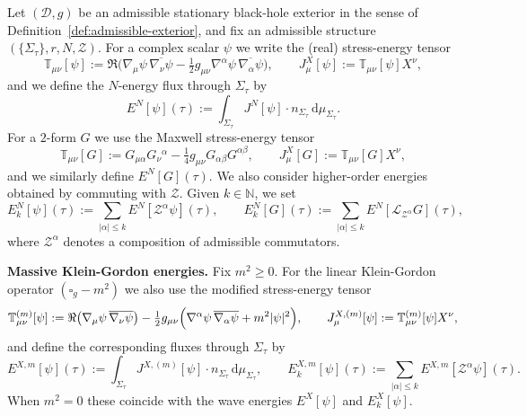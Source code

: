 \documentclass[11pt]{article}
\numberwithin{equation}{section}
\theoremstyle{plain}
\theoremstyle{definition}
\theoremstyle{remark}
\newcommand{\dd}{\mathrm{d}}
\begin{document}
Let $(\mathcal D,g)$ be an admissible stationary black-hole exterior in the sense of Definition~\ref{def:admissible-exterior},
and fix an admissible structure $(\{\Sigma_{\tau}\},r,N,\mathcal Z)$.
For a complex scalar $\psi$ we write the (real) stress-energy tensor
\begin{equation}
\mathbb T_{\mu\nu}[\psi]
:=\Re\bigl(\nabla_{\mu}\psi\,\overline{\nabla_{\nu}\psi}-\tfrac12 g_{\mu\nu}\nabla^{\alpha}\psi\,\overline{\nabla_{\alpha}\psi}\bigr),
\qquad
J^{X}_{\mu}[\psi]:=\mathbb T_{\mu\nu}[\psi]X^{\nu},
\end{equation}
and we define the $N$-energy flux through $\Sigma_{\tau}$ by
\begin{equation}
E^{N}[\psi](\tau):=\int_{\Sigma_{\tau}} J^{N}[\psi]\cdot n_{\Sigma_{\tau}}\,\dd\mu_{\Sigma_{\tau}}.
\end{equation}
For a $2$-form $G$ we use the Maxwell stress-energy tensor
\begin{equation}
\mathbb T_{\mu\nu}[G]:=G_{\mu\alpha}G_{\nu}{}^{\alpha}-\tfrac14 g_{\mu\nu}G_{\alpha\beta}G^{\alpha\beta},
\qquad
J^{X}_{\mu}[G]:=\mathbb T_{\mu\nu}[G]X^{\nu},
\end{equation}
and we similarly define $E^{N}[G](\tau)$.
We also consider higher-order energies obtained by commuting with $\mathcal Z$.
Given $k\in\mathbb N$, we set
\begin{equation}
E^{N}_{k}[\psi](\tau):=\sum_{|\alpha|\le k} E^{N}[\mathcal Z^{\alpha}\psi](\tau),
\qquad
E^{N}_{k}[G](\tau):=\sum_{|\alpha|\le k} E^{N}[\mathcal{L}_{\mathcal Z^{\alpha}}G](\tau),
\end{equation}
where $\mathcal Z^{\alpha}$ denotes a composition of admissible commutators.

\medskip
\noindent\textbf{Massive Klein-Gordon energies.}
Fix $m^{2}\ge 0$.
For the linear Klein-Gordon operator $(\square_{g}-m^{2})$ we also use the modified stress-energy tensor
\begin{equation}
\mathbb T^{(m)}_{\mu\nu}[\psi]
:=
\Re\!\left(\nabla_{\mu}\psi\,\overline{\nabla_{\nu}\psi}\right)
-\tfrac12 g_{\mu\nu}\Bigl(\nabla^{\alpha}\psi\,\overline{\nabla_{\alpha}\psi}+m^{2}|\psi|^{2}\Bigr),
\qquad
J^{X,(m)}_{\mu}[\psi]:=\mathbb T^{(m)}_{\mu\nu}[\psi]X^{\nu},
\end{equation}
and define the corresponding fluxes through $\Sigma_{\tau}$ by
\begin{equation}
E^{X,m}[\psi](\tau):=\int_{\Sigma_{\tau}} J^{X,(m)}[\psi]\cdot n_{\Sigma_{\tau}}\,\dd\mu_{\Sigma_{\tau}},
\qquad
E^{X,m}_{k}[\psi](\tau):=\sum_{|\alpha|\le k}E^{X,m}[\mathcal Z^{\alpha}\psi](\tau).
\end{equation}
When $m^{2}=0$ these coincide with the wave energies $E^{X}[\psi]$ and $E^{X}_{k}[\psi]$.
\end{document}
